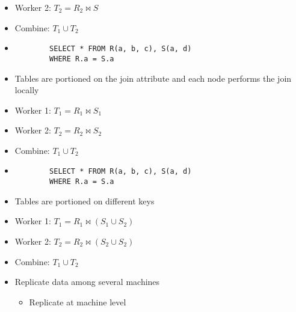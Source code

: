 \begin{itemize}
\begin{itemize}
\begin{itemize}
\begin{itemize}
                            \item Worker 2: $T_2 = R_2 \bowtie S$
                            \item Combine: $T_1 \cup T_2$
                        \end{itemize}
                        \begin{itemize}
                            \item 
        \begin{verbatim}
        SELECT * FROM R(a, b, c), S(a, d)
        WHERE R.a = S.a
        \end{verbatim}
                            \item Tables are portioned on the join attribute and each node performs the join locally
                            \item Worker 1: $T_1 = R_1 \bowtie S_1$
                            \item Worker 2: $T_2 = R_2 \bowtie S_2$
                            \item Combine: $T_1 \cup T_2$
                        \end{itemize}
                        \begin{itemize}
                            \item 
        \begin{verbatim}
        SELECT * FROM R(a, b, c), S(a, d)
        WHERE R.a = S.a
        \end{verbatim}
                            \item Tables are portioned on different keys
                            \item Worker 1: $T_1 = R_1 \bowtie (S_1 \cup S_2)$
                            \item Worker 2: $T_2 = R_2 \bowtie (S_2 \cup S_2)$
                            \item Combine: $T_1 \cup T_2$
                        \end{itemize}
                \end{itemize}
                \begin{itemize}
                    \item Replicate data among several machines
                        \begin{itemize}
                            \item Replicate at machine level

\end{itemize}
\end{itemize}
\end{itemize}
\end{itemize}

